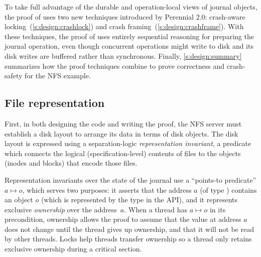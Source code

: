 To take full advantage of the durable and operation-local views of
journal objects, the proof of  uses two new techniques introduced by
Perennial 2.0: crash-aware locking~(\cref{s:design:crashlock}) and crash
framing~(\cref{s:design:crashframe}). With these techniques, the proof of
 uses entirely sequential reasoning for preparing the
journal operation, even though concurrent operations might write to disk and its
disk writes are buffered rather than synchronous.
Finally, \cref{s:design:summary} summarizes how the proof
techniques combine to prove correctness and crash-safety for the NFS 
example.


\subsection{File representation}
\label{s:design:rep}

First, in both designing the code and writing the proof, the NFS server must
establish a disk layout to arrange its data in terms of disk objects. The disk
layout is expressed using a separation-logic \emph{representation invariant}, a
predicate which connects the logical (specification-level) contents of files to the objects (inodes and
blocks) that encode those files.


Representation invariants over the state of the journal use a
``points-to predicate'' $a \mapsto o$, which serves two purposes: it asserts
that the address $a$ (of type ) contains an object $o$ (which is
represented by the  type in the API), and it represents exclusive
\emph{ownership} over the address~$a$. When a thread has $a \mapsto o$ in its
precondition, ownership allows the proof to assume that the value at address $a$
does not change until the thread gives up ownership, and that it will not be
read by other threads.  Locks help threads transfer ownership so a thread only
retains exclusive ownership during a critical section.

